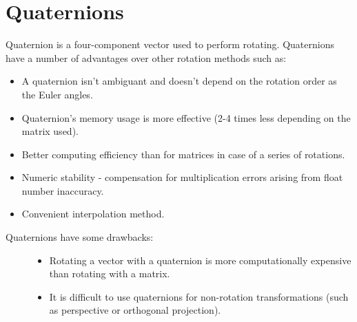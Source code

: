 \documentclass[a4paper,12pt,oneside]{sphinxmanual}
\begin{document}

\section{Quaternions}
\label{developers:id6}\label{developers:index-0}
Quaternion is a four-component vector used to perform rotating. Quaternions have a number of advantages over other rotation methods such as:
\begin{itemize}
\item {} 
A quaternion isn't ambiguant and doesn't depend on the rotation order as the Euler angles.

\item {} 
Quaternion's memory usage is more effective (2-4 times less depending on the matrix used).

\item {} 
Better computing efficiency than for matrices in case of a series of rotations.

\item {} 
Numeric stability - compensation for multiplication errors arising from float number inaccuracy.

\item {} 
Convenient interpolation method.

\end{itemize}
\begin{description}
\item[{Quaternions have some drawbacks:}] \leavevmode\begin{itemize}
\item {} 
Rotating a vector with a quaternion is more computationally expensive than rotating with a matrix.

\item {} 
It is difficult to use quaternions for non-rotation transformations (such as perspective or orthogonal projection).

\end{itemize}

\end{description}
\end{document}
